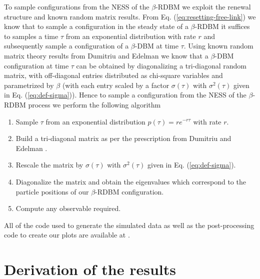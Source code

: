 \documentclass[onecolumn,superscriptaddress,
 amsmath,amssymb,
 aps,
 prd,
]{revtex4-1}
\begin{document}
{{To sample configurations from the NESS of the $\beta$-RDBM we exploit the renewal structure and known random matrix results. From Eq. (\ref{eq:resetting-free-link}) we know that to sample a configuration in the steady state of a $\beta$-RDBM it suffices to samples a time $\tau$ from an exponential distribution with rate $r$ and subsequently sample a configuration of a $\beta$-DBM at time $\tau$. Using known random matrix theory results from Dumitriu and Edelman \cite{DE02} we know that a $\beta$-DBM configuration at time $\tau$ can be obtained by diagonalizing a tri-diagonal random matrix, with off-diagonal entries distributed as chi-square variables and parametrized by $\beta$ (with each entry scaled by a factor $\sigma(\tau)$ with $\sigma^2(\tau)$ given in Eq. (\ref{eq:def-sigma})). Hence to sample a configuration from the NESS of the $\beta$-RDBM process we perform the following algorithm
\begin{enumerate}
    \item Sample $\tau$ from an exponential distribution $p(\tau) = r e^{-r \tau}$ with rate $r$. 
    \item Build a tri-diagonal matrix as per the prescription from Dumitriu and Edelman \cite{DE02}.
    \item Rescale the matrix by $\sigma(\tau)$ with $\sigma^2(\tau)$ given in Eq. (\ref{eq:def-sigma}).
    \item Diagonalize the matrix and obtain the eigenvalues which correspond to the particle positions of our $\beta$-RDBM configuration.
    \item Compute any observable required.
\end{enumerate}
All of the code used to generate the simulated data as well as the post-processing code to create our plots are available at \cite{github}.
}


\section{Derivation of the results} \label{sec:model}

}
\end{document}
